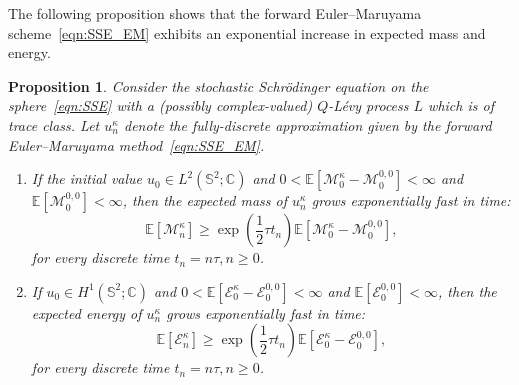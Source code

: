 \documentclass[11pt]{amsart}
\newtheorem{proposition}[theorem]{Proposition}
\newcommand{\IC}{\mathbb{C}}
\newcommand{\E}{{\mathbb E}}
\newcommand{\IS}{\mathbb{S}}
\newcommand{\cE}{\mathcal E}
\newcommand{\cM}{\mathcal M}
\newcommand{\expp}[1]{\exp\left(#1\right)}
\begin{document}
The following proposition shows that the forward Euler--Maruyama scheme~\eqref{eqn:SSE_EM} exhibits an exponential increase in expected mass and energy.
\begin{proposition}
    \label{prop:semi_EM}
    Consider the stochastic Schrödinger equation on the sphere~\eqref{eqn:SSE} with a (possibly complex-valued) $Q$-L\'evy process $L$ which is of trace class.
    Let $u^\kappa_n$ denote the fully-discrete approximation given by the forward Euler--Maruyama method~\eqref{eqn:SSE_EM}.

    \begin{enumerate}[label=\roman*)]
    \item If the initial value $u_0 \in {L^2(\IS^2; \IC)}$ and $0 < \E\left[\cM_0^{\kappa} - \cM_0^{0,0}\right] < \infty$ and $\E\left[\cM_0^{0,0}\right] < \infty$, then
    the expected mass of $u^\kappa_n$ grows exponentially fast in time:
    \begin{equation}\label{eqn:mass_EM}
        \E\left[\cM^\kappa_n\right] \geq \expp{\frac{1}{2}\tau t_n}\E\left[\cM_0^{\kappa} - \cM_0^{0,0}\right],
    \end{equation}
    for every discrete time $t_n = n\tau, n\geq 0$.
    \item If $u_0 \in {H^1(\IS^2; \IC)}$ and  $0 < \E\left[\cE_0^{\kappa} - \cE_0^{0,0}\right] < \infty$ and $\E\left[\cE_0^{0,0}\right] < \infty$, then
     the expected energy of $u^\kappa_n$ grows exponentially fast in time:
    \begin{equation}\label{eqn:energy_EM}
        \E\left[\cE^\kappa_n\right] \geq \expp{\frac{1}{2}\tau t_n}\E\left[\cE_0^{\kappa} - \cE_0^{0,0}\right],
    \end{equation}
    for every discrete time $t_n = n\tau, n\geq 0$.
    \end{enumerate}
\end{proposition}
\end{document}
